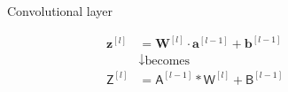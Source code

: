\begin{frame}
  \begin{figure}
    \centering
    \scalebox{.7}{}
    \caption{Convolutional layer}
  \end{figure}

  \begin{align*}
    \bm{z}^{[l]} &= \bm{W}^{[l]} \cdot \bm{a}^{[l - 1]} + \bm{b}^{[l - 1]} \\
    &\downarrow \text{becomes} \\
    \bm{\mathsf{Z}}^{[l]} &= \bm{\mathsf{A}}^{[l - 1]} * \bm{\mathsf{W}}^{[l]} + 
    \bm{\mathsf{B}}^{[l - 1]}
  \end{align*}
\end{frame}
